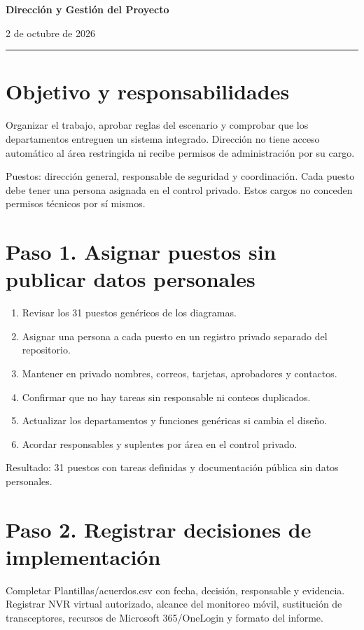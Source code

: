\documentclass[12pt,a4paper]{article}
\begin{document}
{\LARGE\bfseries Dirección y Gestión del Proyecto\par}\vspace{6pt}
2 de octubre de 2026\par\hrule\vspace{10pt}
\section*{Objetivo y responsabilidades}
Organizar el trabajo, aprobar reglas del escenario y comprobar que los departamentos entreguen un sistema integrado. Dirección no tiene acceso automático al área restringida ni recibe permisos de administración por su cargo.\par
Puestos: dirección general, responsable de seguridad y coordinación. Cada puesto debe tener una persona asignada en el control privado. Estos cargos no conceden permisos técnicos por sí mismos.\par
{}\section*{Paso 1. Asignar puestos sin publicar datos personales}
\begin{enumerate}
\item Revisar los 31 puestos genéricos de los diagramas.
\item Asignar una persona a cada puesto en un registro privado separado del repositorio.
\item Mantener en privado nombres, correos, tarjetas, aprobadores y contactos.
\item Confirmar que no hay tareas sin responsable ni conteos duplicados.
\item Actualizar los departamentos y funciones genéricas si cambia el diseño.
\item Acordar responsables y suplentes por área en el control privado.
\end{enumerate}
Resultado: 31 puestos con tareas definidas y documentación pública sin datos personales.\par
{}\section*{Paso 2. Registrar decisiones de implementación}
Completar \textnormal{Plantillas/\allowbreak{}acuerdos.csv} con fecha, decisión, responsable y evidencia. Registrar NVR virtual autorizado, alcance del monitoreo móvil, sustitución de transceptores, recursos de Microsoft 365/OneLogin y formato del informe.\par
\end{document}
